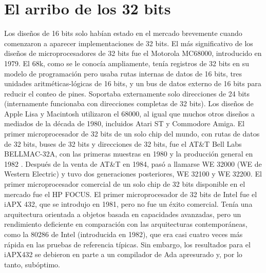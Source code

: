 \section{El arribo de los 32 bits}

Los diseños de 16 bits solo habían estado en el mercado brevemente cuando comenzaron a aparecer implementaciones de 32 bits.
El más significativo de los diseños de  microprocesadores de 32 bits fue el Motorola MC68000, introducido en 1979. 
El 68k, como se le conocía ampliamente, tenía  registros de 32 bits en su modelo de programación pero usaba rutas internas
de datos de 16 bits, tres unidades aritméticas-lógicas de 16 bits, y un bus de datos externo de 16 bits para reducir 
el conteo de pines. Soportaba externamente solo direcciones de 24 bits (internamente funcionaba con direcciones completas de 
32 bits). Los diseños de Apple Lisa y Macintosh utilizaron el 68000, al igual que muchos otros diseños a mediados de la década de 
1980, incluidos Atari ST y Commodore Amiga. El primer microprocesador de 32 bits de un solo chip del mundo, con rutas de datos de 
32 bits, buses de 32 bits y direcciones de 32 bits, fue el AT\&T Bell Labs BELLMAC-32A, con las primeras muestras en 1980 y la producción general en 1982 . 
Después de la venta de AT\&T en 1984, pasó a llamarse WE 32000 (WE de Western Electric) y tuvo dos generaciones posteriores, WE 32100 y WE 32200.
El primer microprocesador comercial de un solo chip de 32 bits disponible en el mercado fue el HP FOCUS.
El primer microprocesador de 32 bits de Intel fue el iAPX 432, que se introdujo en 1981, pero no fue un éxito comercial. Tenía una arquitectura orientada 
a objetos basada en capacidades avanzadas, pero un rendimiento deficiente en comparación con las arquitecturas contemporáneas, como la 80286 de Intel 
(introducida en 1982), que era casi cuatro veces más rápida en las pruebas de referencia típicas. Sin embargo, los resultados para el iAPX432 se 
debieron en parte a un compilador de Ada apresurado y, por lo tanto, subóptimo.

